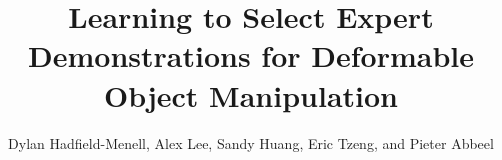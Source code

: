 \documentclass[conference]{IEEEtran}
\begin{document}
\title{Learning to Select Expert Demonstrations for Deformable Object Manipulation}

\author{Dylan Hadfield-Menell, Alex Lee, Sandy Huang, Eric Tzeng, and Pieter Abbeel}





% 


\maketitle
\end{document}
